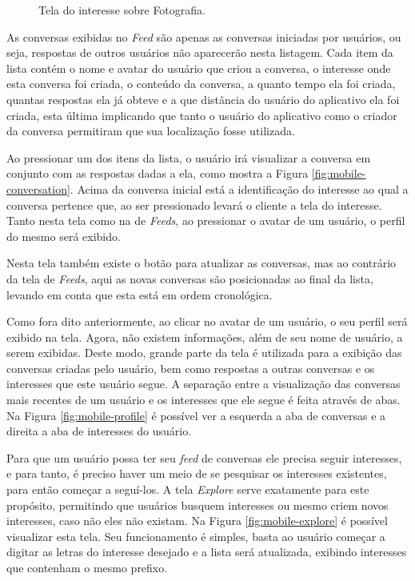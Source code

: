 \documentclass[diss]{template/setrem}
\begin{document}
\begin{figure}[!h]
    \caption{Tela do interesse sobre Fotografia.}
    \label{fig:mobile-interest}
\end{figure}

As conversas exibidas no \emph{Feed} são apenas as conversas iniciadas por usuários, ou seja, respostas de outros usuários não aparecerão nesta listagem. Cada item da lista contém o nome e avatar do usuário que criou a conversa, o interesse onde esta conversa foi criada, o conteúdo da conversa, a quanto tempo ela foi criada, quantas respostas ela já obteve e a que distância do usuário do aplicativo ela foi criada, esta última implicando que tanto o usuário do aplicativo como o criador da conversa permitiram que sua localização fosse utilizada.

Ao pressionar um dos itens da lista, o usuário irá visualizar a conversa em conjunto com as respostas dadas a ela, como mostra a Figura \ref{fig:mobile-conversation}. Acima da conversa inicial está a identificação do interesse ao qual a conversa pertence que, ao ser pressionado levará o cliente a tela do interesse. Tanto nesta tela como na de \emph{Feeds}, ao pressionar o avatar de um usuário, o perfil do mesmo será exibido.

Nesta tela também existe o botão para atualizar as conversas, mas ao contrário da tela de \emph{Feeds}, aqui as novas conversas são posicionadas ao final da lista, levando em conta que esta está em ordem cronológica.

Como fora dito anteriormente, ao clicar no avatar de um usuário, o seu perfil será exibido na tela. Agora, não existem informações, além de seu nome de usuário, a serem exibidas. Deste modo, grande parte da tela é utilizada para a exibição das conversas criadas pelo usuário, bem como respostas a outras conversas e os interesses que este usuário segue. A separação entre a visualização das conversas mais recentes de um usuário e os interesses que ele segue é feita através de abas. Na Figura \ref{fig:mobile-profile} é possível ver a esquerda a aba de conversas e a direita a aba de interesses do usuário.

Para que um usuário possa ter seu \emph{feed} de conversas ele precisa seguir interesses, e para tanto, é preciso haver um meio de se pesquisar os interesses existentes, para então começar a seguí-los. A tela \emph{Explore} serve exatamente para este propósito, permitindo que usuários busquem interesses ou mesmo criem novos interesses, caso não eles não existam. Na Figura \ref{fig:mobile-explore} é possível visualizar esta tela. Seu funcionamento é simples, basta ao usuário começar a digitar as letras do interesse desejado e a lista será atualizada, exibindo interesses que contenham o mesmo prefixo.
\end{document}
